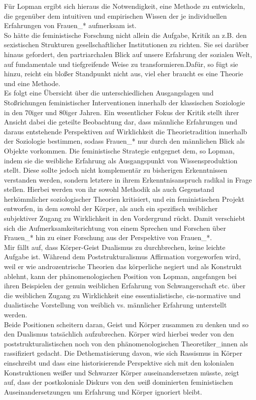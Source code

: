 Für Lopman ergibt sich hieraus die Notwendigkeit, eine Methode zu entwickeln,
die gegenüber dem \glqq intuitiven und empirischen Wissen\grqq \footnotemark
{} der je individuellen
Erfahrungen von Frauen\_* aufmerksam ist.\\
 So hätte die feministische Forschung
nicht allein die Aufgabe, Kritik an z.B. den sexistischen Strukturen
gesellschaftlicher Institutionen zu richten. Sie sei darüber hinaus gefordert,
\glqq den partriarchalen Blick auf unsere Erfahrung der sozialen Welt, auf
fundamentale und tiefgreifende Weise zu transformieren.\grqq Dafür, so fügt sie
hinzu, reicht ein bloßer Standpunkt nicht aus, viel eher braucht es eine
Theorie und eine Methode.\\
 Es folgt eine Übersicht über die unterschiedlichen
Ausgangslagen und Stoßrichungen feministischer Interventionen innerhalb der
klassischen Soziologie in den 70iger und 80iger Jahren. Ein wesentlicher Fokus
der Kritik stellt ihrer Ansicht dabei die geteilte Beobachtung dar, dass
männliche Erfahrungen und daraus entstehende Perspektiven auf Wirklichkeit die
Theorietradition innerhalb der Soziologie bestimmen, sodass Frauen\_* nur durch
den männlichen Blick als Objekte vorkommen. Die feministische Strategie
entgegnet dem, so Lopman, indem sie die weibliche Erfahrung als Ausgangspunkt
von Wissensproduktion stellt. Diese sollte jedoch nicht komplementär zu
bisherigen Erkenntnissen verstanden werden, sondern letztere in ihrem
Erkenntnisanspruch radikal in Frage stellen. Hierbei werden von ihr sowohl
Methodik als auch Gegenstand herkömmlicher soziologischer Theorien kritisiert,
und ein feministischen Projekt entworfen, in dem sowohl der Körper, als auch
ein spezifisch weiblicher subjektiver Zugang zu Wirklichkeit in den Vordergrund
rückt. Damit verschiebt sich die Aufmerksamkeitsrichtung von einem Sprechen und
Forschen über Frauen\_* hin zu einer Forschung aus der Perspektive von
Frauen\_*. \footnotemark {}\\

\noindent Mir fällt auf, dass Körper-Geist Dualismus zu durchbrechen, keine leichte
Aufgabe ist. Während dem Poststrukturalismus Affirmation vorgeworfen wird, weil
er wie androzentrische Theorien das körperliche negiert und als Konstrukt
ablehnt, kann der phänomenologischen Position von Lopman, angefangen bei ihren
Beispielen der genuin weiblichen Erfahrung von Schwangerschaft etc. über die
weiblichen Zugang zu Wirklichkeit eine essentialistische, cis-normative und
dualistische Vorstellung von weiblich vs. männlicher Erfahrung unterstellt
werden. \\
Beide Positionen scheitern daran, Geist und Körper zusammen zu denken
und so den Dualismus tatsächlich aufzubrechen. Körper wird hierbei weder von
den poststrukturalistischen noch von den phänomenologischen Theoretiker\_innen
als rassifiziert gedacht. Die Dethematisierung davon, wie sich Rassismus in
Körper einschreibt und dass eine historisierende Perspektive sich mit den
kolonialen Konstruktionen weißer und Schwarzer Körper auseinandersetzen müsste,
zeigt auf, dass der postkoloniale Diskurs von den \textit{w}eiß dominierten
feministischen Auseinandersetzungen um Erfahrung und Körper ignoriert bleibt.\\


